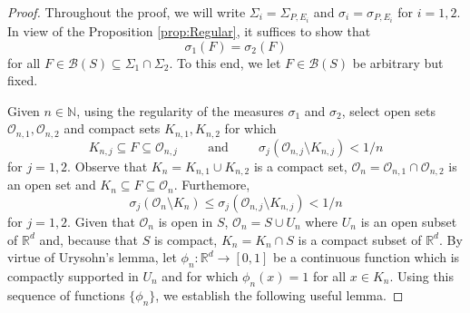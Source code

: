 \documentclass[11pt]{article}
\theoremstyle{remark}
\begin{document}
\begin{proof}
Throughout the proof, we will write $\Sigma_i=\Sigma_{P,E_i}$ and $\sigma_i=\sigma_{P,E_i}$ for $i=1,2$. In view of the Proposition \ref{prop:Regular}, it suffices to show that 
\begin{equation*}
\sigma_1(F)=\sigma_2(F)
\end{equation*}
for all $F\in \mathcal{B}(S)\subseteq \Sigma_{1}\cap\Sigma_{2}$. To this end, we let $F\in\mathcal{B}(S)$ be arbitrary but fixed. 

Given $n\in\mathbb{N}$, using the regularity of the measures $\sigma_1$ and $\sigma_2$, select open sets $\mathcal{O}_{n,1},\mathcal{O}_{n,2}$ and compact sets $K_{n,1},K_{n,2}$ for which
\begin{equation*}
K_{n,j}\subseteq F\subseteq \mathcal{O}_{n,j}\hspace{1cm}\mbox{and}\hspace{1cm}\sigma_j(\mathcal{O}_{n,j}\setminus K_{n,j})<1/n
\end{equation*}
for $j=1,2$. Observe that $K_n=K_{n,1}\cup K_{n,2}$ is a compact set, $\mathcal{O}_n=\mathcal{O}_{n,1}\cap\mathcal{O}_{n,2}$ is an open set and $K_n\subseteq F\subseteq \mathcal{O}_n$. Furthemore, 
\begin{equation*}
\sigma_j(\mathcal{O}_n\setminus K_n)\leq \sigma_j(\mathcal{O}_{n,j}\setminus K_{n,j})<1/n
\end{equation*}
for $j=1,2$. Given that $\mathcal{O}_n$ is open in $S$, $\mathcal{O}_n=S\cup U_n$ where $U_n$ is an open subset of $\mathbb{R}^d$ and, because that $S$ is compact, $K_n=K_n\cap S$ is a compact subset of $\mathbb{R}^d$. By virtue of Urysohn's lemma, let $\phi_n:\mathbb{R}^d\to [0,1]$ be a continuous function which is compactly supported in $U_n$ and for which $\phi_n(x)=1$ for all $x\in K_n$. Using this sequence of functions $\{\phi_n\}$, we establish the following useful lemma.


\end{proof}
\end{document}
